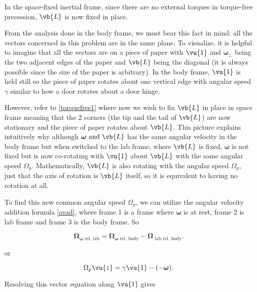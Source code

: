 \documentclass[a4paper,12pt]{report}
\begin{document}
In the space-fixed inertial frame, since there are no external torques in torque-free precession, \(\vb{L} \) is now fixed in place. 

From the analysis done in the body frame, we must bear this fact in mind: all the vectors concerned in this problem are in the same plane. To visualize, it is helpful to imagine that all the vectors are on a piece of paper with \(\vu{1} \) and \(\boldsymbol{\omega } _{\perp } \) being the two adjacent edges of the paper and \(\vb{L} \) being the diagonal (it is always possible since the size of the paper is arbitrary). In the body frame, \(\vu{1} \) is held still so the piece of paper rotates about one vertical edge with angular speed \(\gamma \) similar to how a door rotates about a door hinge.  

However, refer to \cref{torquefree1} where now we wish to fix \(\vb{L} \) in place in space frame meaning that the 2 corners (the tip and the tail of \(\vb{L} \)) are now stationary and the piece of paper rotates about \(\vb{L} \). This picture explains intuitively why although \(\boldsymbol{\omega } \text{ and } \vb{L}\) has the same angular velocity in the body frame but when switched to the lab frame, where \(\vb{L} \) is fixed, \(\boldsymbol{\omega } \) is not fixed but is now co-rotating with \(\vu{1} \) about \(\vb{L} \) with the same angular speed \(\Omega _{p} \). Mathematically, \(\vb{L} \) is also rotating with the angular speed \(\Omega _{p} \), just that the axis of rotation is \(\vb{L} \) itself, so it is equivalent to having no rotation at all.    

To find this new common angular speed \(\Omega _{p} \), we can utilize the angular velocity addition formula \cref{avad}, where frame 1 is a frame where \(\boldsymbol{\omega } \) is at rest, frame 2 is lab frame and frame 3 is the body frame. So

\begin{equation}
	\boldsymbol{\Omega } _{\boldsymbol{\omega }  \text{ rel. lab} } = \boldsymbol{\Omega } _{\boldsymbol{\omega } \text{ rel. body}   } - \boldsymbol{\Omega } _  \text{ lab rel. body} .
\end{equation}

or

\begin{equation}
	\Omega _{p} \vu{z} = \gamma \vu{1} - (-\boldsymbol{\omega } ).
\end{equation}


Resolving this vector equation along \(\vu{1} \) gives
\end{document}
